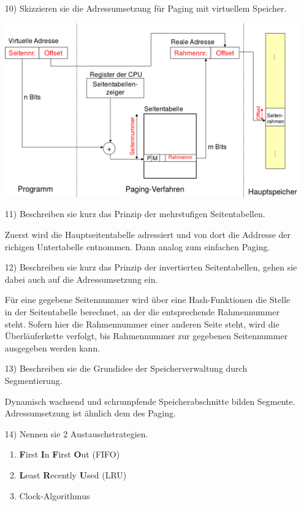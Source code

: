 \documentclass[11pt,a4paper]{article}
\begin{document}
\begin{itemize}
\item[10)] Skizzieren sie die Adressumsetzung für Paging mit virtuellem Speicher.

\includegraphics[scale=0.5]{adress.png}

\item[11)] Beschreiben sie kurz das Prinzip der mehrstufigen Seitentabellen.

Zuerst wird die Hauptseitentabelle adressiert und von dort die Addresse der richigen Untertabelle entnommen. Dann analog zum einfachen Paging. 

\item[12)] Beschreiben sie kurz das Prinzip der invertierten Seitentabellen, gehen sie dabei auch auf die Adressumsetzung ein.

Für eine gegebene Seitennummer wird über eine Hash-Funktionen die Stelle in der Seitentabelle berechnet, an der die entsprechende Rahmennummer steht. Sofern hier die Rahmennummer einer anderen Seite steht, wird die Überläuferkette verfolgt, bis Rahmennummer zur gegebenen Seitennummer ausgegeben werden kann.

\item[13)] Beschreiben sie die Grundidee der Speicherverwaltung durch Segmentierung.

Dynamisch wachsend und schrumpfende Speicherabschnitte bilden Segmente. Adressumsetzung ist ähnlich dem des Paging.

\item[14)] Nennen sie 2 Austauschstrategien.
\begin{enumerate}
\item \textbf{F}irst \textbf{I}n \textbf{F}irst \textbf{O}ut (FIFO)
\item \textbf{L}east \textbf{R}ecently \textbf{U}sed (LRU)
\item Clock-Algorithmus
\end{enumerate}
\end{itemize}
\end{document}
